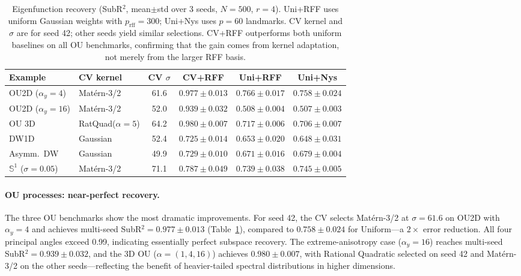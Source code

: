 \documentclass[11pt]{article}
\theoremstyle{remark}
\begin{document}
\begin{table}[t]
\centering
\small
\begin{tabular}{llcccc}
\toprule
Example & CV kernel & CV $\sigma$ & \textbf{CV+RFF} & Uni+RFF & Uni+Nys \\
\midrule
OU2D ($\alpha_y\!=\!4$) & Mat\'ern-3/2 & 61.6 & $\mathbf{0.977\pm0.013}$ & $0.766\pm0.017$ & $0.758\pm0.024$ \\
OU2D ($\alpha_y\!=\!16$) & Mat\'ern-3/2 & 52.0 & $\mathbf{0.939\pm0.032}$ & $0.508\pm0.004$ & $0.507\pm0.003$ \\
OU 3D & RatQuad($\alpha\!=\!5$) & 64.2 & $\mathbf{0.980\pm0.007}$ & $0.717\pm0.006$ & $0.706\pm0.007$ \\
DW1D & Gaussian & 52.4 & $\mathbf{0.725\pm0.014}$ & $0.653\pm0.020$ & $0.648\pm0.031$ \\
Asymm.\ DW & Gaussian & 49.9 & $\mathbf{0.729\pm0.010}$ & $0.671\pm0.016$ & $0.679\pm0.004$ \\
$\mathbb{S}^1$ ($\sigma\!=\!0.05$) & Mat\'ern-3/2 & 71.1 & $\mathbf{0.787\pm0.049}$ & $0.739\pm0.038$ & $0.745\pm0.005$ \\
\bottomrule
\end{tabular}
\caption{Eigenfunction recovery (SubR$^2$, mean$\pm$std over 3 seeds, $N\!=\!500$, $r\!=\!4$). Uni+RFF uses uniform Gaussian weights with $p_{\mathrm{rff}}\!=\!300$; Uni+Nys uses $p\!=\!60$ landmarks. CV kernel and $\sigma$ are for seed 42; other seeds yield similar selections. CV+RFF outperforms both uniform baselines on all OU benchmarks, confirming that the gain comes from kernel adaptation, not merely from the larger RFF basis.}
\label{tab:main-results}
\end{table}

\paragraph{OU processes: near-perfect recovery.}
The three OU benchmarks show the most dramatic improvements.
For seed 42, the CV selects Mat\'ern-3/2 at $\sigma=61.6$ on OU2D with $\alpha_y=4$ and achieves multi-seed SubR$^2=0.977\pm 0.013$ (Table~\ref{tab:main-results}), compared to $0.758\pm 0.024$ for Uniform---a $2\times$ error reduction.
All four principal angles exceed 0.99, indicating essentially perfect subspace recovery.
The extreme-anisotropy case ($\alpha_y=16$) reaches multi-seed SubR$^2=0.939\pm 0.032$, and the 3D OU ($\alpha=(1,4,16)$) achieves $0.980\pm 0.007$, with Rational Quadratic selected on seed 42 and Mat\'ern-3/2 on the other seeds---reflecting the benefit of heavier-tailed spectral distributions in higher dimensions.
\end{document}
